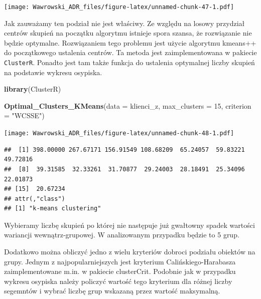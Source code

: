 \documentclass[
]{book}
\newenvironment{Shaded}{\begin{snugshade}}{\end{snugshade}}
\newcommand{\DataTypeTok}[1]{\textcolor[rgb]{0.13,0.29,0.53}{#1}}
\newcommand{\DecValTok}[1]{\textcolor[rgb]{0.00,0.00,0.81}{#1}}
\newcommand{\KeywordTok}[1]{\textcolor[rgb]{0.13,0.29,0.53}{\textbf{#1}}}
\newcommand{\NormalTok}[1]{#1}
\newcommand{\StringTok}[1]{\textcolor[rgb]{0.31,0.60,0.02}{#1}}
\begin{document}
\texttt{[image: Wawrowski\_ADR\_files/figure-latex/unnamed-chunk-47-1.pdf]}

Jak zauważamy ten podział nie jest właściwy. Ze względu na losowy przydział centrów skupień na początku algorytmu istnieje spora szansa, że rozwiązanie nie będzie optymalne. Rozwiązaniem tego problemu jest użycie algorytmu kmeans++ do początkowego ustalenia centrów. Ta metoda jest zaimplementowana w pakiecie \texttt{ClusterR}. Ponadto jest tam także funkcja do ustalenia optymalnej liczby skupień na podstawie wykresu osypiska.

\begin{Shaded}
\begin{Highlighting}[]
\KeywordTok{library}\NormalTok{(ClusterR)}

\KeywordTok{Optimal_Clusters_KMeans}\NormalTok{(}\DataTypeTok{data =}\NormalTok{ klienci_z, }\DataTypeTok{max_clusters =} \DecValTok{15}\NormalTok{, }\DataTypeTok{criterion =} \StringTok{"WCSSE"}\NormalTok{)}
\end{Highlighting}
\end{Shaded}

\texttt{[image: Wawrowski\_ADR\_files/figure-latex/unnamed-chunk-48-1.pdf]}

\begin{verbatim}
##  [1] 398.00000 267.67171 156.91549 108.68209  65.24057  59.83221  49.72816
##  [8]  39.31585  32.33261  31.70877  29.24003  28.18491  25.34096  22.01873
## [15]  20.67234
## attr(,"class")
## [1] "k-means clustering"
\end{verbatim}

Wybieramy liczbę skupień po której nie następuje już gwałtowny spadek wartości wariancji wewnątrz-grupowej. W analizowanym przypadku będzie to 5 grup.

Dodatkowo można obliczyć jedno z wielu kryteriów dobroci podziału obiektów na grupy. Jednym z najpopularniejszych jest kryterium Calińskiego-Harabasza zaimplementowane m.in. w pakiecie clusterCrit. Podobnie jak w przypadku wykresu osypiska należy policzyć wartość tego kryterium dla różnej liczby segemntów i wybrać liczbę grup wskazaną przez wartość maksymalną.
\end{document}
